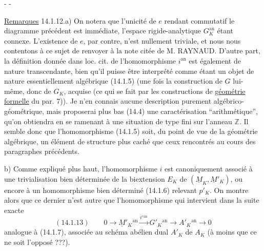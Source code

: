 \begin{center}-  -\end{center}
\uline{Remarques} 14.1.12.\quad a) On notera que l'unicité de $e$ rendant commutatif
le diagramme précédent est immédiate, l'espace rigide-analytique $G_K^{\mathrm{an}}$
étant connexe. L'existence de $e$, par contre, n'est nullement triviale,
et nous nous contentons à ce sujet de renvoyer à la note citée de
M. RAYNAUD. D'autre part, la définition donnée dans loc. cit. de
l'homomorphisme $i^{\mathrm{an}}$ est également de nature transcendante, bien qu'il
puisse être interprété comme étant un objet de nature essentiellement
algébrique (14.1.5) (une fois la construction de $G$ lui-même, donc de
$G_K$, acquise (ce qui se fait par les constructions de \uline{géométrie formelle}
du par. 7)). Je n'en connais aucune description purement algébrico-géométrique,
mais proposerai plus bas (14.4) une caractérisation
``arithmétique'', qu'on obtiendra en se ramenant à une situation de type
fini sur l'anneau $\mathbb Z$. Il semble donc que l'homomorphisme (14.1.5) soit,
du point de vue de la géométrie algébrique, un élément de structure
plus caché que ceux rencontrés au cours des paragraphes précédents.

b) Comme expliqué plus haut, l'homomorphisme $i$ est canoniquement
associé à une trivialisation bien déterminée de la biextension $E_K$ de
$(\underline M_K,\underline M'_K)$, ou encore à un homomorphisme bien déterminé (14.1.6) relevant $p'_K$.
On montre alors que ce dernier n'est autre que l'homomorphisme qui
intervient dans la suite exacte
\[
(14.1.13)\qquad0\longrightarrow\underline M'_K{}^{\mathrm{an}}
\xrightarrow{i'{}^{\mathrm{an}}}G'_K{}^{\mathrm{an}}\longrightarrow A'_K{}^{\mathrm{an}}\longrightarrow0
\]
analogue à (14.1.7), associée au schéma abélien dual $A'_K$ de $A_K$ (à moins
que ce ne soit l'opposé ???).
